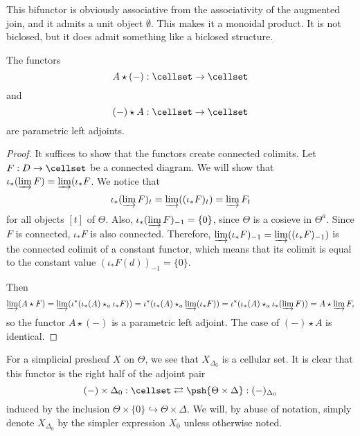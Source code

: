 This bifunctor is obviously associative from the associativity of the augmented join, and it admits a unit object \(\emptyset\).  This makes it a monoidal product.  It is not biclosed, but it does admit something like a biclosed structure.
\begin{prop} The functors \[A\star (-):\cellset \to \cellset\] and \[(-)\star A:\cellset\to \cellset\] are parametric left adjoints.
\end{prop}
\begin{proof}It suffices to show that the functors create connected colimits. Let \(F:D\to \cellset\) be a connected diagram.  We will show that \(\iota_\ast(\varinjlim F)=\varinjlim(\iota_\ast F\).  We notice that \[\iota_\ast(\varinjlim F)_t=\varinjlim ((\iota_\ast F)_t)=\varinjlim F_t\] for all objects \([t]\) of \(\Theta\).  Also, \(\iota_\ast(\varinjlim F)_{-1}=\{0\}\), since \(\Theta\) is a cosieve in \(\Theta^a\).  Since \(F\) is connected, \(\iota_\ast F\) is also connected.  Therefore, \(\varinjlim(\iota_\ast F)_{-1}=\varinjlim((\iota_\ast F)_{-1})\) is the connected colimit of a constant functor, which means that its colimit is equal to the constant value \((\iota_\ast F(d))_{-1}=\{0\}\).

Then \[\varinjlim(A\star F)=\varinjlim(\iota^\ast(\iota_\ast(A)\star_a \iota_\ast F))=\iota^\ast(\iota_\ast(A) \star_a \varinjlim (\iota_\ast F))=\iota^\ast(\iota_\ast(A) \star_a \iota_\ast(\varinjlim F))=A\star \varinjlim F,\] so the functor \(A\star(-)\) is a parametric left adjoint.  The case of \((-)\star A\) is identical.   
\end{proof}

For a simplicial presheaf \(X\) on \(\Theta\), we see that \(X_{\Delta_0}\) is a cellular set.  It is clear that this functor is the right half of the adjoint pair
\[(-)\times \Delta_0:\cellset \rightleftarrows \psh{\Theta\times \Delta}: (-)_{\Delta_0}\] induced by the inclusion \(\Theta\times \{0\}\hookrightarrow \Theta\times\Delta\).  We will, by abuse of notation, simply denote \(X_{\Delta_0}\) by the simpler expression \(X_0\) unless otherwise noted.  

